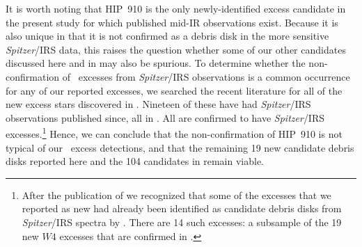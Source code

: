 It is worth noting that HIP~910 is the only newly-identified excess candidate in the present study for which published mid-IR observations exist.  Because it is also unique in that it is not confirmed as a debris disk in the more sensitive \textit{ Spitzer}/IRS data, this raises the question whether some of our other candidates discussed here and in  may also be spurious.  To determine whether the non-confirmation of \WS\ excesses from \textit{ Spitzer}/IRS observations is a common occurrence for any of our reported excesses, we searched the recent literature for all of the new excess stars discovered in .
Nineteen of these have had \textit{ Spitzer}/IRS observations published since, all in \citet{Chen2014}.
All are confirmed to have \textit{ Spitzer}/IRS excesses.\footnote{After the publication of  we recognized that some of the excesses that we reported as new had already been identified as candidate debris disks from \textit{ Spitzer}/IRS spectra by \citet{Ballering2013}.  There are 14 such excesses: a subsample of the 19 new  $W4$ excesses that are confirmed in \citet{Chen2014}.}
Hence, we can conclude that the non-confirmation of HIP~910 is not typical of our \WS\ excess detections, and that the remaining 19 new candidate debris disks reported here and the 104 candidates in  remain viable.



